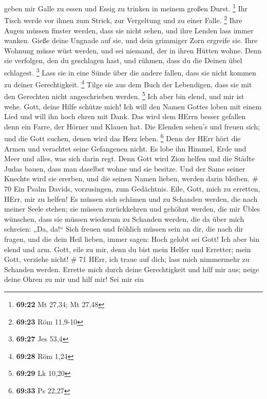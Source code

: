 geben mir Galle zu essen und Essig zu trinken in meinem großen Durst.
\footnote{\textbf{69:22} Mt 27,34; Mt 27,48}  Ihr Tisch
werde vor ihnen zum Strick, zur Vergeltung und zu einer Falle.
\footnote{\textbf{69:23} Röm 11,9-10}  Ihre Augen müssen
finster werden, dass sie nicht sehen, und ihre Lenden lass immer wanken.
 Gieße deine Ungnade auf sie, und dein grimmiger Zorn
ergreife sie.  Ihre Wohnung müsse wüst werden, und sei
niemand, der in ihren Hütten wohne.  Denn sie verfolgen,
den du geschlagen hast, und rühmen, dass du die Deinen übel schlagest.
\footnote{\textbf{69:27} Jes 53,4}  Lass sie in eine Sünde
über die andere fallen, dass sie nicht kommen zu deiner Gerechtigkeit.
\footnote{\textbf{69:28} Röm 1,24}  Tilge sie aus dem Buch
der Lebendigen, dass sie mit den Gerechten nicht angeschrieben werden.
\footnote{\textbf{69:29} Lk 10,20}  Ich aber bin elend, und
mir ist wehe. Gott, deine Hilfe schütze mich!  Ich will den
Namen Gottes loben mit einem Lied und will ihn hoch ehren mit Dank.
 Das wird dem HErrn besser gefallen denn ein Farre, der
Hörner und Klauen hat.  Die Elenden sehen's und freuen
sich; und die Gott suchen, denen wird das Herz leben. \footnote{\textbf{69:33}
  Ps 22,27}  Denn der HErr hört die Armen und verachtet
seine Gefangenen nicht.  Es lobe ihn Himmel, Erde und Meer
und alles, was sich darin regt.  Denn Gott wird Zion helfen
und die Städte Judas bauen, dass man daselbst wohne und sie besitze.
 Und der Same seiner Knechte wird sie ererben, und die
seinen Namen lieben, werden darin bleiben. \# 70  Ein Psalm
Davids, vorzusingen, zum Gedächtnis.  Eile, Gott, mich zu
erretten, HErr, mir zu helfen!  Es müssen sich schämen und
zu Schanden werden, die nach meiner Seele stehen; sie müssen
zurückkehren und gehöhnt werden, die mir Übles wünschen, 
dass sie müssen wiederum zu Schanden werden, die da über mich schreien:
„Da, da!{}``  Sich freuen und fröhlich müssen sein an dir,
die nach dir fragen, und die dein Heil lieben, immer sagen: Hoch gelobt
sei Gott!  Ich aber bin elend und arm. Gott, eile zu mir,
denn du bist mein Helfer und Erretter; mein Gott, verziehe nicht! \# 71
 HErr, ich traue auf dich; lass mich nimmermehr zu Schanden
werden.  Errette mich durch deine Gerechtigkeit und hilf mir
aus; neige deine Ohren zu mir und hilf mir!  Sei mir ein
